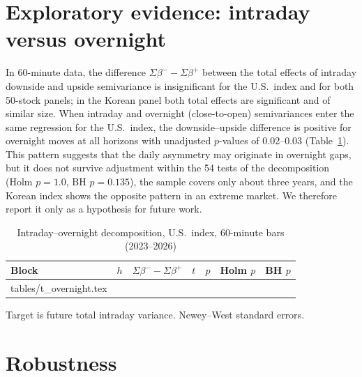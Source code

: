 \documentclass[11pt]{article}
\makeatletter
\newcommand\inputtable[1]{\@@input #1 }
\makeatother
\begin{document}
\section{Exploratory evidence: intraday versus overnight}\label{app:overnight}

In 60-minute data, the difference $\Sigma\beta^{-}-\Sigma\beta^{+}$ between the total effects of intraday downside and upside semivariance is insignificant for the U.S.\ index and for both 50-stock panels; in the Korean panel both total effects are significant and of similar size. When intraday and overnight (close-to-open) semivariances enter the same regression for the U.S.\ index, the downside--upside difference is positive for overnight moves at all horizons with unadjusted $p$-values of 0.02--0.03 (Table~\ref{tab:overnight}). This pattern suggests that the daily asymmetry may originate in overnight gaps, but it does not survive adjustment within the 54 tests of the decomposition (Holm $p=1.0$, BH $p=0.135$), the sample covers only about three years, and the Korean index shows the opposite pattern in an extreme market. We therefore report it only as a hypothesis for future work.

\begin{table}[!htbp]
\centering
\begin{threeparttable}
\caption{Intraday--overnight decomposition, U.S.\ index, 60-minute bars (2023--2026)}\label{tab:overnight}
\small
\begin{tabular}{lcccccc}
\toprule
Block & $h$ & $\Sigma\beta^{-}-\Sigma\beta^{+}$ & $t$ & $p$ & Holm $p$ & BH $p$ \\
\midrule
\inputtable{tables/t_overnight.tex}
\bottomrule
\end{tabular}
\begin{tablenotes}\footnotesize
\item Target is future total intraday variance. Newey--West standard errors.
\end{tablenotes}
\end{threeparttable}
\end{table}

\section{Robustness}\label{app:robust}
\end{document}
